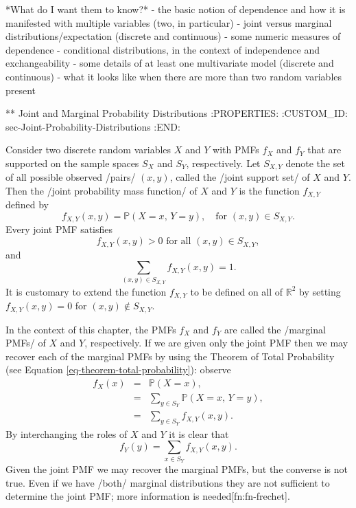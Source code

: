*What do I want them to know?*
- the basic notion of dependence and how it is manifested with
  multiple variables (two, in particular)
- joint versus marginal distributions/expectation (discrete and
  continuous)
- some numeric measures of dependence
- conditional distributions, in the context of independence and
  exchangeability
- some details of at least one multivariate model (discrete and
  continuous)
- what it looks like when there are more than two random variables
  present

** Joint and Marginal Probability Distributions
:PROPERTIES:
:CUSTOM_ID: sec-Joint-Probability-Distributions
:END:

Consider two discrete random variables \(X\) and \(Y\) with PMFs
\(f_{X}\) and \(f_{Y}\) that are supported on the sample spaces
\(S_{X}\) and \(S_{Y}\), respectively. Let \(S_{X,Y}\) denote the set
of all possible observed /pairs/ \((x,y)\), called the /joint support
set/ of \(X\) and \(Y\). Then the /joint probability mass function/ of
\(X\) and \(Y\) is the function \(f_{X,Y}\) defined by
\begin{equation}
\label{eq-joint-pmf}
f_{X,Y}(x,y)=\mathbb{P}(X=x,\, Y=y),\quad \mbox{for }(x,y)\in S_{X,Y}.
\end{equation}
Every joint PMF satisfies
\begin{equation}
f_{X,Y}(x,y)>0\mbox{ for all }(x,y)\in S_{X,Y},
\end{equation}
and
\begin{equation}
\sum_{(x,y)\in S_{X,Y}}f_{X,Y}(x,y)=1.
\end{equation}
It is customary to extend the function \(f_{X,Y}\) to be defined on
all of \(\mathbb{R}^{2}\) by setting \(f_{X,Y}(x,y)=0\) for
\((x,y)\not\in S_{X,Y}\).

In the context of this chapter, the PMFs \(f_{X}\) and \(f_{Y}\) are
called the /marginal PMFs/ of \(X\) and \(Y\), respectively. If we are
given only the joint PMF then we may recover each of the marginal PMFs
by using the Theorem of Total Probability (see Equation
\eqref{eq-theorem-total-probability}): observe
\begin{eqnarray}
f_{X}(x) & = & \mathbb{P}(X=x),\\
 & = & \sum_{y\in S_{Y}}\mathbb{P}(X=x,\, Y=y),\\
 & = & \sum_{y\in S_{Y}}f_{X,Y}(x,y).
\end{eqnarray}
By interchanging the roles of \(X\) and \(Y\) it is clear that 
\begin{equation}
\label{eq-marginal-pmf}
f_{Y}(y)=\sum_{x\in S_{Y}}f_{X,Y}(x,y).
\end{equation}
Given the joint PMF we may recover the marginal PMFs, but the converse
is not true. Even if we have /both/ marginal distributions they are
not sufficient to determine the joint PMF; more information is
needed[fn:fn-frechet].

